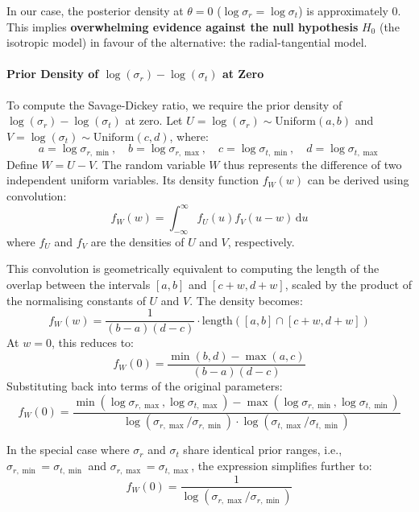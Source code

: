 \documentclass[11pt]{article}
\begin{document}
In our case, the posterior density at $\theta=0$ ($\log \sigma_r = \log \sigma_t$) is approximately 0. This implies \textbf{overwhelming evidence against the null hypothesis} \( H_0 \) (the isotropic model) in favour of the alternative: the radial-tangential model.

\paragraph{Prior Density of \texorpdfstring{\( \log(\sigma_r) - \log(\sigma_t) \)}{log(\sigma_r) - log(\sigma_t)} at Zero}

To compute the Savage-Dickey ratio, we require the prior density of \( \log(\sigma_r) - \log(\sigma_t) \) at zero. Let \( U = \log(\sigma_r) \sim \text{Uniform}(a, b) \) and \( V = \log(\sigma_t) \sim \text{Uniform}(c, d) \), where:
\[
a = \log \sigma_{r,\min}, \quad b = \log \sigma_{r,\max}, \quad c = \log \sigma_{t,\min}, \quad d = \log \sigma_{t,\max}
\]
Define \( W = U - V \). The random variable \( W \) thus represents the difference of two independent uniform variables. Its density function \( f_W(w) \) can be derived using convolution:
\[
f_W(w) = \int_{-\infty}^{\infty} f_U(u) f_V(u - w)\, \mathrm{d}u
\]
where \( f_U \) and \( f_V \) are the densities of \( U \) and \( V \), respectively.

This convolution is geometrically equivalent to computing the length of the overlap between the intervals \( [a, b] \) and \( [c + w, d + w] \), scaled by the product of the normalising constants of \( U \) and \( V \). The density becomes:
\[
f_W(w) = \frac{1}{(b-a)(d-c)} \cdot \text{length}([a, b] \cap [c+w, d+w])
\]
At \( w = 0 \), this reduces to:
\[
f_W(0) = \frac{\min(b, d) - \max(a, c)}{(b-a)(d-c)}
\]
Substituting back into terms of the original parameters:
\[
f_W(0) = \frac{\min(\log \sigma_{r,\max}, \log \sigma_{t,\max}) - \max(\log \sigma_{r,\min}, \log \sigma_{t,\min})}{\log(\sigma_{r,\max}/\sigma_{r,\min}) \cdot \log(\sigma_{t,\max}/\sigma_{t,\min})}
\]

In the special case where \(\sigma_r\) and \(\sigma_t\) share identical prior ranges, i.e., \(\sigma_{r,\min} = \sigma_{t,\min}\) and \(\sigma_{r,\max} = \sigma_{t,\max}\), the expression simplifies further to:
\[
f_W(0) = \frac{1}{\log(\sigma_{r,\max}/\sigma_{r,\min})}
\]
\end{document}
